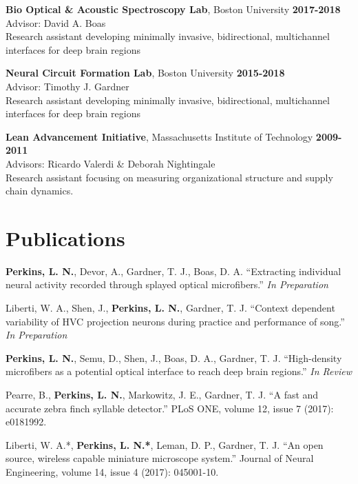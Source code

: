 \textbf{Bio Optical \& Acoustic Spectroscopy Lab}, Boston University \hfill \textbf{2017-2018} \\
	Advisor: David A. Boas \\
	Research assistant developing minimally invasive, bidirectional, multichannel interfaces for deep brain regions

\textbf{Neural Circuit Formation Lab}, Boston University \hfill \textbf{2015-2018} \\
	Advisor: Timothy J. Gardner \\
	Research assistant developing minimally invasive, bidirectional, multichannel interfaces for deep brain regions

\textbf{Lean Advancement Initiative}, Massachusetts Institute of Technology \hfill \textbf{2009-2011} \\
	Advisors: Ricardo Valerdi \& Deborah Nightingale \\
	Research assistant focusing on measuring organizational structure and supply chain dynamics.

\section*{Publications}

\textbf{Perkins, L. N.}, Devor, A., Gardner, T. J., Boas, D. A. ``Extracting individual neural activity recorded through splayed optical microfibers.'' \textit{In Preparation}

Liberti, W. A., Shen, J., \textbf{Perkins, L. N.}, Gardner, T. J. ``Context dependent variability of HVC projection neurons during practice and performance of song.'' \textit{In Preparation}

\textbf{Perkins, L. N.}, Semu, D., Shen, J., Boas, D. A., Gardner, T. J. ``High-density microfibers as a potential optical interface to reach deep brain regions.'' \textit{In Review}


Pearre, B., \textbf{Perkins, L. N.}, Markowitz, J. E., Gardner, T. J. ``A fast and accurate zebra finch syllable detector.'' PLoS ONE, volume  12, issue 7 (2017): e0181992.

Liberti, W. A.*, \textbf{Perkins, L. N.*}, Leman, D. P., Gardner, T. J. ``An open source, wireless capable miniature microscope system.'' Journal of Neural Engineering, volume 14, issue 4 (2017): 045001-10.


